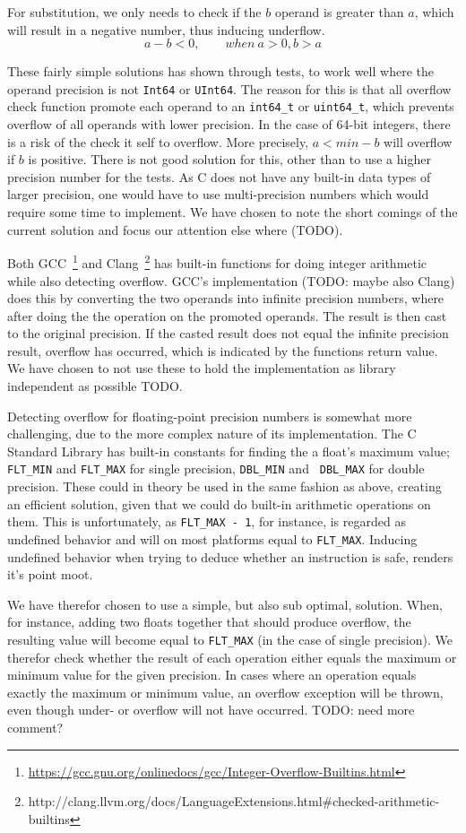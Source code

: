 For substitution, we only needs to check if the $b$ operand is greater
than $a$, which will result in a negative number, thus inducing underflow.
\begin{equation}
  a - b < 0, \qquad when\ a > 0, b > a
\end{equation}

These fairly simple solutions has shown through tests, to work well where the
operand precision is not {\tt Int64} or {\tt UInt64}. The reason for this is
that all overflow check function promote each operand to an {\tt int64\_t} or
{\tt uint64\_t}, which prevents overflow of all operands with lower
precision. In the case of 64-bit integers, there is a risk of the check it self
to overflow. More precisely, $a < min - b$ will overflow if $b$ is
positive. There is not good solution for this, other than to use a higher
precision number for the tests. As C does not have any built-in data types of
larger precision, one would have to use multi-precision numbers which would
require some time to implement. We have chosen to note the short comings of the
current solution and focus our attention else where (TODO).

Both
GCC~\footnote{\url{https://gcc.gnu.org/onlinedocs/gcc/Integer-Overflow-Builtins.html}}
and
Clang~\footnote{http://clang.llvm.org/docs/LanguageExtensions.html#checked-arithmetic-builtins}
has built-in functions for doing integer arithmetic while also detecting
overflow. GCC's implementation (TODO: maybe also Clang) does this by converting
the two operands into infinite precision numbers, where after doing the the
operation on the promoted operands. The result is then cast to the original
precision. If the casted result does not equal the infinite precision result,
overflow has occurred, which is indicated by the functions return value. We have
chosen to not use these to hold the implementation as library independent as
possible TODO.

Detecting overflow for floating-point precision numbers is somewhat more
challenging, due to the more complex nature of its implementation. The C
Standard Library has built-in constants for finding the a float's maximum value;
{\tt FLT\_MIN} and {\tt FLT\_MAX} for single precision, {\tt DBL\_MIN} and {\tt
  DBL\_MAX} for double precision. These could in theory be used in the same
fashion as above, creating an efficient solution, given that we could do
built-in arithmetic operations on them. This is unfortunately, as {\tt FLT\_MAX
  - 1}, for instance, is regarded as undefined behavior and will on most
platforms equal to {\tt FLT\_MAX}. Inducing undefined behavior when trying to
deduce whether an instruction is safe, renders it's point moot.

We have therefor chosen to use a simple, but also sub optimal, solution. When,
for instance, adding two floats together that should produce overflow, the
resulting value will become equal to {\tt FLT\_MAX} (in the case of single
precision). We therefor check whether the result of each operation either equals
the maximum or minimum value for the given precision. In cases where an
operation equals exactly the maximum or minimum value, an overflow exception
will be thrown, even though under- or overflow will not have occurred. TODO:
need more comment?
